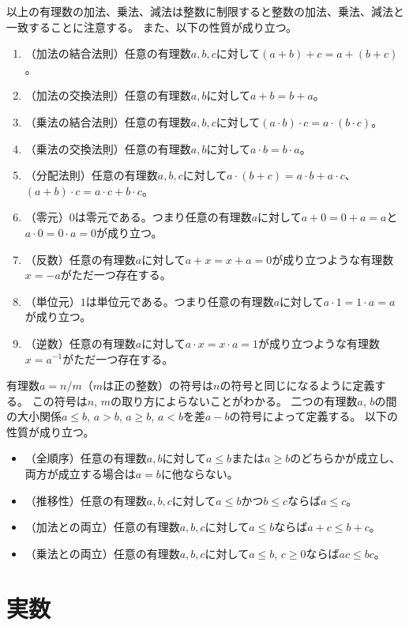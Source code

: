 以上の有理数の加法、乗法、減法は整数に制限すると整数の加法、乗法、減法と一致することに注意する。
また、以下の性質が成り立つ。
\begin{enumerate}
\item
（加法の結合法則）任意の有理数$a, b, c$に対して$(a+b)+c = a+(b+c)$。
\item
（加法の交換法則）任意の有理数$a, b$に対して$a+b = b+a$。
\item
（乗法の結合法則）任意の有理数$a, b, c$に対して$(a\cdot b)\cdot c = a\cdot (b\cdot c)$。
\item
（乗法の交換法則）任意の有理数$a, b$に対して$a\cdot b = b\cdot a$。
\item
（分配法則）任意の有理数$a, b, c$に対して$a\cdot (b+c) = a\cdot b+a\cdot c$、$(a+b)\cdot c = a\cdot c+b\cdot c$。
\item
（零元）$0$は零元である。つまり任意の有理数$a$に対して$a+0 = 0+a = a$と$a\cdot 0 = 0\cdot a = 0$が成り立つ。
\item
（反数）任意の有理数$a$に対して$a+x = x+a = 0$が成り立つような有理数$x = -a$がただ一つ存在する。
\item
（単位元）$1$は単位元である。つまり任意の有理数$a$に対して$a\cdot 1 = 1\cdot a = a$が成り立つ。
\item
（逆数）任意の有理数$a$に対して$a\cdot x = x\cdot a = 1$が成り立つような有理数$x = a^{-1}$がただ一つ存在する。
\end{enumerate}

有理数$a = n/m$（$m$は正の整数）の符号は$n$の符号と同じになるように定義する。
この符号は$n$, $m$の取り方によらないことがわかる。
二つの有理数$a$, $b$の間の大小関係$a \le b$, $a > b$, $a \ge b$, $a < b$を差$a-b$の符号によって定義する。
以下の性質が成り立つ。
\begin{itemize}
\item
（全順序）任意の有理数$a, b$に対して$a \le b$または$a \ge b$のどちらかが成立し、両方が成立する場合は$a = b$に他ならない。
\item
（推移性）任意の有理数$a, b, c$に対して$a \le b$かつ$b \le c$ならば$a \le c$。
\item
（加法との両立）任意の有理数$a, b, c$に対して$a \le b$ならば$a+c \le b+c$。
\item
（乗法との両立）任意の有理数$a, b, c$に対して$a \le b$, $c \ge 0$ならば$a c \le b c$。
\end{itemize}

\section{実数}


